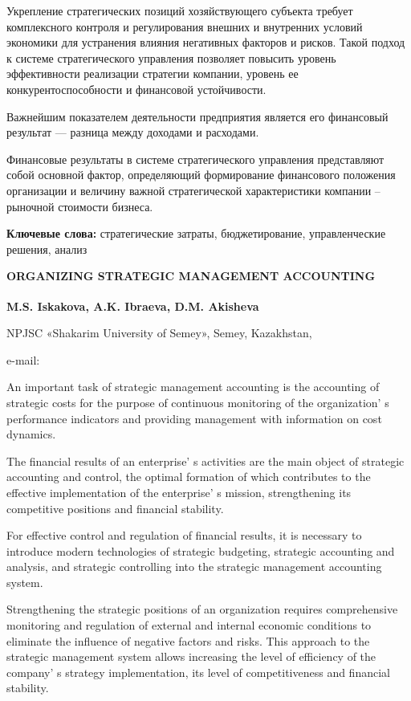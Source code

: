 Укрепление стратегических позиций хозяйствующего субъекта требует
комплексного контроля и регулирования внешних и внутренних условий
экономики для устранения влияния негативных факторов и рисков. Такой
подход к системе стратегического управления позволяет повысить уровень
эффективности реализации стратегии компании, уровень ее
конкурентоспособности и финансовой устойчивости.

Важнейшим показателем деятельности предприятия является его финансовый
результат --- разница между доходами и расходами.

Финансовые результаты в системе стратегического управления представляют
собой основной фактор, определяющий формирование финансового положения
организации и величину важной стратегической характеристики компании --
рыночной стоимости бизнеса.

{\bfseries Ключевые слова:} стратегические затраты, бюджетирование,
управленческие решения, анализ

{\bfseries ORGANIZING STRATEGIC MANAGEMENT ACCOUNTING}

{\bfseries M.S. Iskakova\textsuperscript{\envelope }, A.K. Ibraeva, D.M. Akisheva}

NPJSC «Shakarim University of Semey», Semey, Kazakhstan,

e-mail: \href{mailto:mis0508@mail.ru}{}

An important task of strategic management accounting is the accounting
of strategic costs for the purpose of continuous monitoring of the
organization' s performance indicators and providing
management with information on cost dynamics.

The financial results of an enterprise' s activities are
the main object of strategic accounting and control, the optimal
formation of which contributes to the effective implementation of the
enterprise' s mission, strengthening its competitive
positions and financial stability.

For effective control and regulation of financial results, it is
necessary to introduce modern technologies of strategic budgeting,
strategic accounting and analysis, and strategic controlling into the
strategic management accounting system.

Strengthening the strategic positions of an organization requires
comprehensive monitoring and regulation of external and internal
economic conditions to eliminate the influence of negative factors and
risks. This approach to the strategic management system allows
increasing the level of efficiency of the company' s
strategy implementation, its level of competitiveness and financial
stability.

